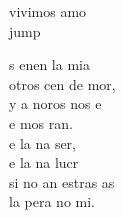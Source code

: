\begin{cancion}
	vivimos  amo\\jump\\
	\begin{chorus}%
	s enen la mia\\
	otros cen de mor,\\
	y a noros  nos e\\
	e mos ran.\\
	e la na ser,\\
	e la na lucr\\
	si no an estras as\\
	la pera no mi.\\
	\end{chorus}%
	\jump\\
\end{cancion}%
